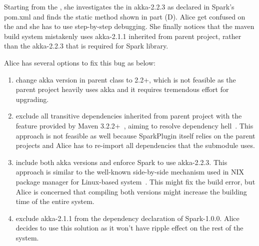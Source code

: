 
Starting from the , she investigates the   in akka-2.2.3 as declared in Spark's pom.xml and finds the static  method shown in part (D). Alice get confused on the  and she has to use step-by-step debugging. She finally notices that the maven build system mistakenly uses akka-2.1.1 inherited from parent project, rather than the akka-2.2.3 that is required for Spark library. 


  Alice has several options to fix this bug as below:
\begin{enumerate}
\item change akka version in parent class to 2.2+, which is not feasible as the parent project heavily uses akka and it requires tremendous effort for upgrading.
\item  exclude all transitive dependencies inherited from parent project with the feature provided by Maven 3.2.2+~\cite{maven:note}, aiming to resolve dependency hell~\cite{maven:hell}. This approach is not feasible as well because SparkPlugin itself relies on the parent projects and Alice has to re-import all dependencies that the submodule uses.
\item include both akka versions and enforce Spark to use akka-2.2.3. This approach is similar to the well-known side-by-side  mechanism used in NIX package manager for Linux-based system~\cite{nix}. This might fix the build error, but Alice is concerned that compiling both versions might increase the building time of the entire system. 
\item exclude akka-2.1.1 from the dependency declaration of Spark-1.0.0. Alice decides to use this solution as it won't have ripple effect on the rest of the system.
\end{enumerate}



